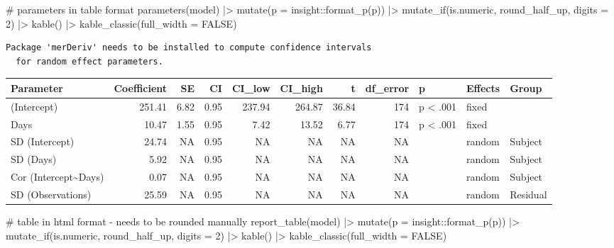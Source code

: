 \documentclass[
  letterpaper,
  DIV=11,
  numbers=noendperiod]{scrreprt}
\newenvironment{Shaded}{\begin{snugshade}}{\end{snugshade}}
\newcommand{\AttributeTok}[1]{\textcolor[rgb]{0.40,0.45,0.13}{#1}}
\newcommand{\CommentTok}[1]{\textcolor[rgb]{0.37,0.37,0.37}{#1}}
\newcommand{\ConstantTok}[1]{\textcolor[rgb]{0.56,0.35,0.01}{#1}}
\newcommand{\DecValTok}[1]{\textcolor[rgb]{0.68,0.00,0.00}{#1}}
\newcommand{\FunctionTok}[1]{\textcolor[rgb]{0.28,0.35,0.67}{#1}}
\newcommand{\NormalTok}[1]{\textcolor[rgb]{0.00,0.23,0.31}{#1}}
\newcommand{\SpecialCharTok}[1]{\textcolor[rgb]{0.37,0.37,0.37}{#1}}
\begin{document}
\begin{Shaded}
\begin{Highlighting}[]
\CommentTok{\# parameters in table format}
\FunctionTok{parameters}\NormalTok{(model) }\SpecialCharTok{|\textgreater{}}
  \FunctionTok{mutate}\NormalTok{(}\AttributeTok{p =}\NormalTok{ insight}\SpecialCharTok{::}\FunctionTok{format\_p}\NormalTok{(p)) }\SpecialCharTok{|\textgreater{}}
  \FunctionTok{mutate\_if}\NormalTok{(is.numeric, round\_half\_up, }\AttributeTok{digits =} \DecValTok{2}\NormalTok{) }\SpecialCharTok{|\textgreater{}}
  \FunctionTok{kable}\NormalTok{() }\SpecialCharTok{|\textgreater{}}
  \FunctionTok{kable\_classic}\NormalTok{(}\AttributeTok{full\_width =} \ConstantTok{FALSE}\NormalTok{)}
\end{Highlighting}
\end{Shaded}

\begin{verbatim}
Package 'merDeriv' needs to be installed to compute confidence intervals
  for random effect parameters.
\end{verbatim}

\begin{longtable*}[t]{lrrrrrrrlll}
\toprule
Parameter & Coefficient & SE & CI & CI\_low & CI\_high & t & df\_error & p & Effects & Group\\
\midrule
(Intercept) & 251.41 & 6.82 & 0.95 & 237.94 & 264.87 & 36.84 & 174 & p < .001 & fixed & \\
Days & 10.47 & 1.55 & 0.95 & 7.42 & 13.52 & 6.77 & 174 & p < .001 & fixed & \\
SD (Intercept) & 24.74 & NA & 0.95 & NA & NA & NA & NA &  & random & Subject\\
SD (Days) & 5.92 & NA & 0.95 & NA & NA & NA & NA &  & random & Subject\\
Cor (Intercept\textasciitilde{}Days) & 0.07 & NA & 0.95 & NA & NA & NA & NA &  & random & Subject\\
\addlinespace
SD (Observations) & 25.59 & NA & 0.95 & NA & NA & NA & NA &  & random & Residual\\
\bottomrule
\end{longtable*}

\begin{Shaded}
\begin{Highlighting}[]
\CommentTok{\# table in html format {-} needs to be rounded manually}
\FunctionTok{report\_table}\NormalTok{(model) }\SpecialCharTok{|\textgreater{}}
  \FunctionTok{mutate}\NormalTok{(}\AttributeTok{p =}\NormalTok{ insight}\SpecialCharTok{::}\FunctionTok{format\_p}\NormalTok{(p)) }\SpecialCharTok{|\textgreater{}}
  \FunctionTok{mutate\_if}\NormalTok{(is.numeric, round\_half\_up, }\AttributeTok{digits =} \DecValTok{2}\NormalTok{) }\SpecialCharTok{|\textgreater{}}
  \FunctionTok{kable}\NormalTok{() }\SpecialCharTok{|\textgreater{}}
  \FunctionTok{kable\_classic}\NormalTok{(}\AttributeTok{full\_width =} \ConstantTok{FALSE}\NormalTok{)}
\end{Highlighting}
\end{Shaded}
\end{document}
